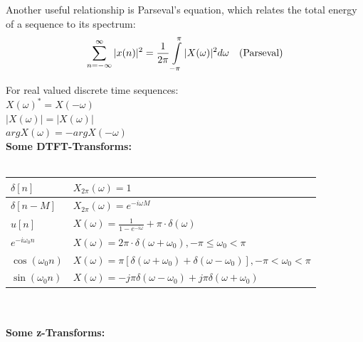 Another useful relationship is Parseval’s equation, which relates the total energy of a sequence to its spectrum: 
\begin{align}
\sum_{n=-\infty}^{\infty} |x(n)|^2= \frac{1}{2\pi} \int\limits_{-\pi}^{\pi} |X(\omega)|^2 d\omega && \text{(Parseval)} \notag
\end{align}

For real valued discrete time sequences:\\
	$X(\omega)^* = X(-\omega)$ \\
	$|X(\omega)| = |X(\omega)|$\\
	$argX(\omega) = -argX(-\omega)$\\

\textbf{Some DTFT-Transforms:}\\ \\

\begin{tabularx}{0.7\textwidth}{|l|X|}
	\hline
	$\delta[n]$ &	$X_{2\pi}(\omega) = 1$ \\
	\hline 	
	$\delta[n-M]$ &	$X_{2\pi}(\omega) = e^{-i\omega M}$ \\
	\hline
	$u[n]$ & %
	$X(\omega) = \frac{1}{1-e^{-i \omega}} + \pi \cdot \delta (\omega) $ \\
	\hline
	$e^{-i \omega_0 n}$ &	$X(\omega) = 2\pi\cdot \delta (\omega +\omega_0),     -\pi \leq \omega_0 < \pi$ \\
	\hline
	$\cos(\omega_0 n) $ & $X(\omega) = \pi [\delta (\omega +\omega_0)+\delta (\omega -\omega_0)],     -\pi < \omega_0 < \pi $\\
	\hline
	$\sin(\omega_0 n) $ & $X(\omega) = -j \pi \delta(\omega - \omega_0) + j \pi \delta(\omega + \omega_0)$\\
	\hline
\end{tabularx} \\ \\


\textbf{Some z-Transforms:}\\ \\

